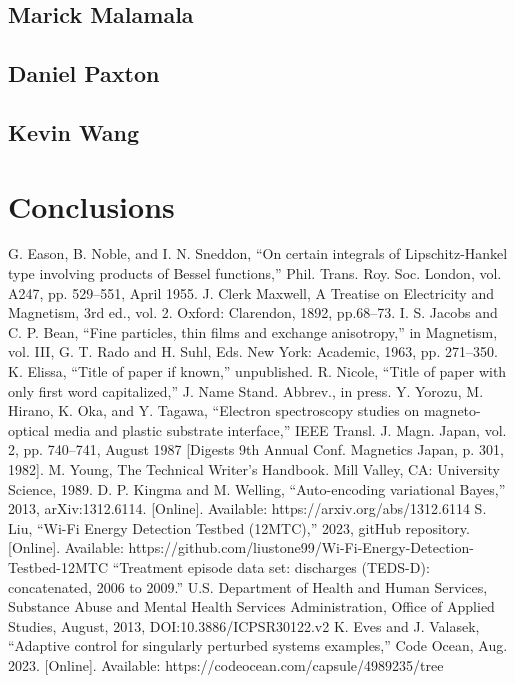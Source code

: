\documentclass[conference]{IEEEtran}
\begin{document}
\subsection{Marick Malamala}

\subsection{Daniel Paxton}

\subsection{Kevin Wang}


\section{Conclusions}




\begin{thebibliography}{00}
 G. Eason, B. Noble, and I. N. Sneddon, ``On certain integrals of Lipschitz-Hankel type involving products of Bessel functions,'' Phil. Trans. Roy. Soc. London, vol. A247, pp. 529--551, April 1955.
 J. Clerk Maxwell, A Treatise on Electricity and Magnetism, 3rd ed., vol. 2. Oxford: Clarendon, 1892, pp.68--73.
 I. S. Jacobs and C. P. Bean, ``Fine particles, thin films and exchange anisotropy,'' in Magnetism, vol. III, G. T. Rado and H. Suhl, Eds. New York: Academic, 1963, pp. 271--350.
 K. Elissa, ``Title of paper if known,'' unpublished.
 R. Nicole, ``Title of paper with only first word capitalized,'' J. Name Stand. Abbrev., in press.
 Y. Yorozu, M. Hirano, K. Oka, and Y. Tagawa, ``Electron spectroscopy studies on magneto-optical media and plastic substrate interface,'' IEEE Transl. J. Magn. Japan, vol. 2, pp. 740--741, August 1987 [Digests 9th Annual Conf. Magnetics Japan, p. 301, 1982].
 M. Young, The Technical Writer's Handbook. Mill Valley, CA: University Science, 1989.
 D. P. Kingma and M. Welling, ``Auto-encoding variational Bayes,'' 2013, arXiv:1312.6114. [Online]. Available: https://arxiv.org/abs/1312.6114
 S. Liu, ``Wi-Fi Energy Detection Testbed (12MTC),'' 2023, gitHub repository. [Online]. Available: https://github.com/liustone99/Wi-Fi-Energy-Detection-Testbed-12MTC
 ``Treatment episode data set: discharges (TEDS-D): concatenated, 2006 to 2009.'' U.S. Department of Health and Human Services, Substance Abuse and Mental Health Services Administration, Office of Applied Studies, August, 2013, DOI:10.3886/ICPSR30122.v2
 K. Eves and J. Valasek, ``Adaptive control for singularly perturbed systems examples,'' Code Ocean, Aug. 2023. [Online]. Available: https://codeocean.com/capsule/4989235/tree
\end{thebibliography}
\end{document}
